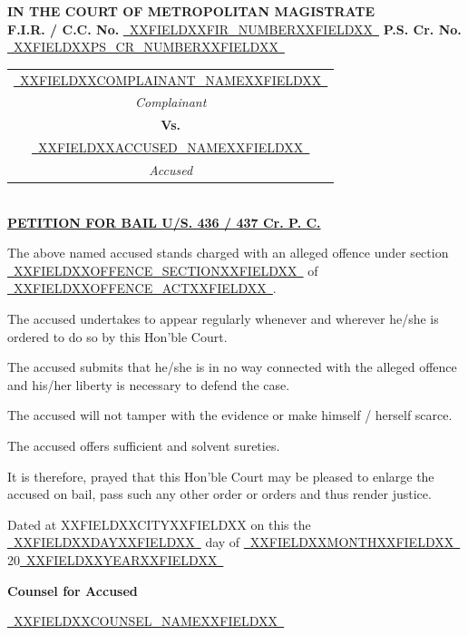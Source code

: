 \documentclass[12pt, a4paper]{article}
\newcommand{\fillline}[1]{\underline{~#1~}}
\begin{document}
\begin{center}
    {\large \textbf{IN THE COURT OF METROPOLITAN MAGISTRATE}} \\[6pt]
    {\normalsize \textbf{F.I.R. / C.C. No.} \fillline{XXFIELDXXFIR_NUMBERXXFIELDXX} \quad \textbf{P.S. Cr. No.} \fillline{XXFIELDXXPS_CR_NUMBERXXFIELDXX}} \\[10pt]
    \begin{tabular}{c}
        \fillline{XXFIELDXXCOMPLAINANT_NAMEXXFIELDXX} \\
        \textit{Complainant} \\[6pt]
        \textbf{Vs.} \\[6pt]
        \fillline{XXFIELDXXACCUSED_NAMEXXFIELDXX} \\
        \textit{Accused}
    \end{tabular}
    \\[14pt]
    {\large \textbf{\uline{PETITION FOR BAIL U/S. 436 / 437 Cr. P. C.}}}
\end{center}

\vspace{10pt}

\noindent The above named accused stands charged with an alleged offence under section \fillline{XXFIELDXXOFFENCE_SECTIONXXFIELDXX} of \fillline{XXFIELDXXOFFENCE_ACTXXFIELDXX}.

\vspace{8pt}
\noindent The accused undertakes to appear regularly whenever and wherever he/she is ordered to do so by this Hon'ble Court.

\vspace{8pt}
\noindent The accused submits that he/she is in no way connected with the alleged offence and his/her liberty is necessary to defend the case.

\vspace{8pt}
\noindent The accused will not tamper with the evidence or make himself / herself scarce.

\vspace{8pt}
\noindent The accused offers sufficient and solvent sureties.

\vspace{12pt}
\noindent It is therefore, prayed that this Hon'ble Court may be pleased to enlarge the accused on bail, pass such any other order or orders and thus render justice.

\vspace{30pt}

\noindent Dated at XXFIELDXXCITYXXFIELDXX on this the \fillline{XXFIELDXXDAYXXFIELDXX} day of \fillline{XXFIELDXXMONTHXXFIELDXX} 20\fillline{XXFIELDXXYEARXXFIELDXX}

\vspace{30pt}

\noindent\hfill \textbf{Counsel for Accused}

\vspace{10pt}
\noindent\hfill \fillline{XXFIELDXXCOUNSEL_NAMEXXFIELDXX}
\end{document}
